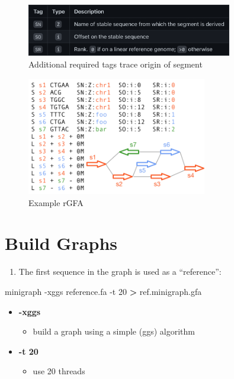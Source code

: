 \documentclass[
]{book}
\newenvironment{Shaded}{\begin{snugshade}}{\end{snugshade}}
\newcommand{\AttributeTok}[1]{\textcolor[rgb]{0.77,0.63,0.00}{#1}}
\newcommand{\ExtensionTok}[1]{#1}
\newcommand{\NormalTok}[1]{#1}
\newcommand{\OperatorTok}[1]{\textcolor[rgb]{0.81,0.36,0.00}{\textbf{#1}}}
\providecommand{\tightlist}{%
  \setlength{\itemsep}{0pt}\setlength{\parskip}{0pt}}
\begin{document}
\begin{figure}
\centering
\includegraphics[width=0.8\textwidth,height=\textheight]{./Figures/rGFA1.png}
\caption{Additional required tags trace origin of segment}
\end{figure}

\begin{figure}
\centering
\includegraphics[width=0.7\textwidth,height=\textheight]{./Figures/rGFA2.png}
\caption{Example rGFA}
\end{figure}

\hypertarget{build-graphs}{%
\section{Build Graphs}\label{build-graphs}}

\begin{enumerate}
\def\labelenumi{\arabic{enumi}.}
\tightlist
\item
  The first sequence in the graph is used as a ``reference'':
\end{enumerate}

\begin{Shaded}
\begin{Highlighting}[]
\ExtensionTok{minigraph} \AttributeTok{{-}xggs}\NormalTok{ reference.fa }\AttributeTok{{-}t}\NormalTok{ 20 }\OperatorTok{\textgreater{}}\NormalTok{ ref.minigraph.gfa}
\end{Highlighting}
\end{Shaded}

\begin{itemize}
\tightlist
\item
  \textbf{-xggs}

  \begin{itemize}
  \tightlist
  \item
    build a graph using a simple (ggs) algorithm
  \end{itemize}
\item
  \textbf{-t 20}

  \begin{itemize}
  \tightlist
  \item
    use 20 threads
  \end{itemize}
\end{itemize}
\end{document}
